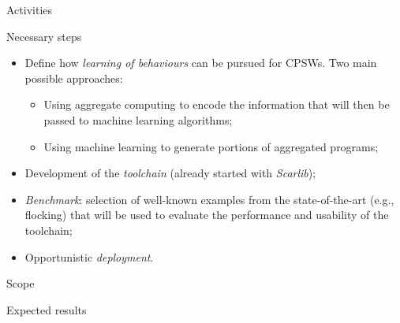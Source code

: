 \documentclass[presentation]{beamer}\mode<presentation>{\usetheme{AMSBolognaFC}}
\begin{document}
\begin{frame}[c]{Activities}

\begin{block}{Necessary steps}
	\begin{itemize}
		\item Define how \emph{learning of behaviours} can be pursued for CPSWs. 
			Two main possible approaches:
			\begin{itemize}
				\item Using aggregate computing to encode the information that will then be 
					passed to machine learning algorithms;
				\item Using machine learning to generate portions of aggregated programs;
			\end{itemize}
		\item Development of the \emph{toolchain} (already started with \emph{Scarlib});
		\item \emph{Benchmark}: selection of well-known examples from the state-of-the-art (e.g., flocking) 
			that will be used to evaluate the performance and usability of the toolchain;
		\item Opportunistic \emph{deployment}.
	\end{itemize}
\end{block}
	
\end{frame}

\begin{frame}[c]{Scope}

\end{frame}


\begin{frame}[c]{Expected results}

\end{frame}



\section*{}

\frame{\titlepage}

\section*{\refname}

\begin{frame}{\refname}
	\tiny
	\nocite{*}
	\printbibliography
\end{frame}

\end{document}
